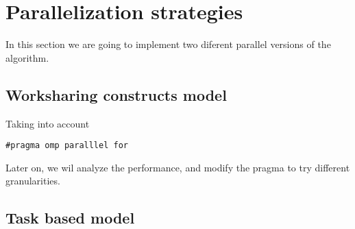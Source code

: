 \section{Parallelization strategies}
In this section we are going to implement two diferent parallel versions of the \sieve algorithm.

\subsection{Worksharing constructs model}
Taking into account 

\begin{lstlisting}
#pragma omp paralllel for
\end{lstlisting}

Later on, we wil analyze the performance, and modify the pragma to try different granularities.

\subsection{Task based model}
